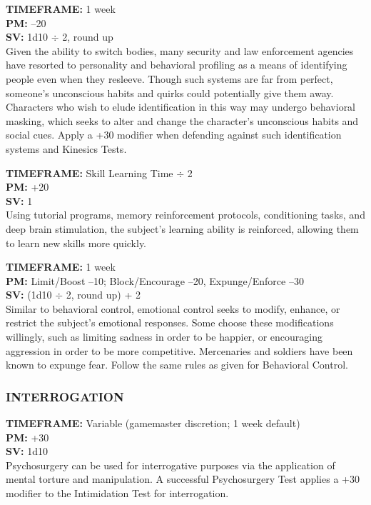  \textbf{TIMEFRAME:} 1 week \\ \textbf{PM:} –20 \\ \textbf{SV:} 1d10 $\div$ 2, round up \\ Given the ability to switch bodies, many security and law enforcement agencies have resorted to personality and behavioral profiling as a means of identifying people even when they resleeve. Though such systems are far from perfect, someone’s unconscious habits and quirks could potentially give them away. Characters who wish to elude identification in this way may undergo behavioral masking, which seeks to alter and change the character’s unconscious habits and social cues. Apply a +30 modifier when defending against such identification systems and Kinesics Tests. 

 \textbf{TIMEFRAME:} Skill Learning Time $\div$ 2 \\ \textbf{PM:} +20 \\ \textbf{SV:} 1 \\ Using tutorial programs, memory reinforcement protocols, conditioning tasks, and deep brain stimulation, the subject’s learning ability is reinforced, allowing them to learn new skills more quickly. 

 \textbf{TIMEFRAME:} 1 week \\ \textbf{PM:} Limit/Boost –10; Block/Encourage –20, Expunge/Enforce –30 \\ \textbf{SV:} (1d10 $\div$ 2, round up) + 2 \\ Similar to behavioral control, emotional control seeks to modify, enhance, or restrict the subject’s emotional responses. Some choose these modifications willingly, such as limiting sadness in order to be happier, or encouraging aggression in order to be more competitive. Mercenaries and soldiers have been known to expunge fear. Follow the same rules as given for Behavioral Control. 



\subsubsection{INTERROGATION} \textbf{TIMEFRAME:} Variable (gamemaster discretion; 1 week default) \\ \textbf{PM:} +30 \\ \textbf{SV:} 1d10 \\ Psychosurgery can be used for interrogative purposes via the application of mental torture and manipulation. A successful Psychosurgery Test applies a +30 modifier to the Intimidation Test for interrogation. 


